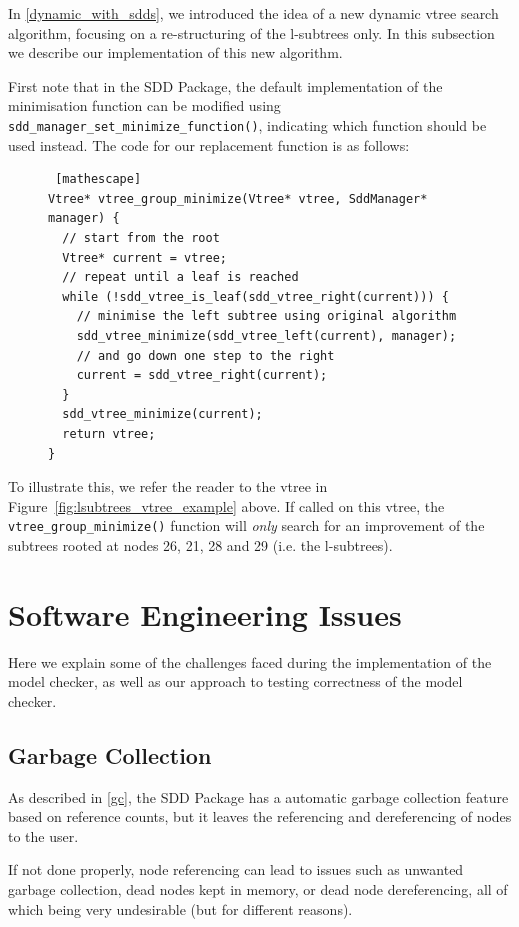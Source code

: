 \documentclass[11pt]{report}
\begin{document}
In \ref{dynamic_with_sdds}, we introduced the idea of a new dynamic vtree search algorithm, focusing on a re-structuring of the l-subtrees only. In this subsection we describe our implementation of this new algorithm.


First note that in the SDD Package, the default implementation of the minimisation function can be modified using \texttt{sdd\_manager\_set\_minimize\_function()},  indicating which function should be used instead.
The code for our replacement function is as follows: 
\begin{figure}

\begin{lstlisting} [mathescape]
Vtree* vtree_group_minimize(Vtree* vtree, SddManager* manager) {
  // start from the root   
  Vtree* current = vtree; 
  // repeat until a leaf is reached
  while (!sdd_vtree_is_leaf(sdd_vtree_right(current))) {
    // minimise the left subtree using original algorithm
    sdd_vtree_minimize(sdd_vtree_left(current), manager);
    // and go down one step to the right
    current = sdd_vtree_right(current);	
  }
  sdd_vtree_minimize(current);
  return vtree;
} 
\end{lstlisting}

\end{figure}

To illustrate this, we refer the reader to the vtree in Figure~\ref{fig:lsubtrees_vtree_example} above. If called on this vtree, the \texttt{vtree\_group\_minimize()} function will \textit{only }search for an improvement of the subtrees rooted at nodes 26, 21, 28 and 29 (i.e. the l-subtrees). 

\section{Software Engineering Issues}
\label{issues}
Here we explain some of the challenges faced during the implementation of the model checker, as well as our approach to testing correctness of the model checker. 

\subsection{Garbage Collection}

As described in \ref{gc}, the SDD Package has a automatic garbage collection feature based on reference counts, but it leaves the referencing and dereferencing of nodes to the user. 

If not done properly, node referencing can lead to issues such as unwanted garbage collection, dead nodes kept in memory, or dead node dereferencing, all of which being very undesirable (but for different reasons).
\end{document}
